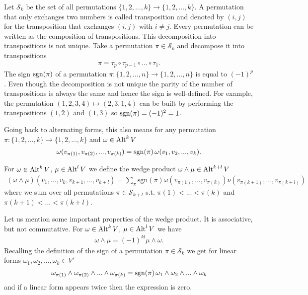 \documentclass[../master_thesis.tex]{subfiles}
\begin{document}
Let $\mathcal{S}_k$ be the set of all permutations 
$\{ 1, 2, ..., k\} \rightarrow \{ 1, 2, ..., k \}$. A 
permutation that only exchanges two numbers is called transposition 
and denoted by $(i,j)$ for the transposition that exchanges $(i,j)$ with 
$i \neq j$. Every permutation can be written as the composition of 
transpositions. This decomposition into transpositions is not unique.
Take a permutation $\pi \in \mathcal{S}_k$ and decompose it into transpositions
\begin{align*}
    \pi = \tau_p \circ \tau_{p-1} \circ ... \circ \tau_1.
\end{align*}
The sign $\operatorname{sgn}(\pi)$ of a permutation 
$\pi: \{ 1,2,...,n\} \rightarrow \{ 1,2, ..., n\}$ is equal to $(-1)^p$.
Even though the decomposition is not unique the parity of the number of
transpositions is always the same and hence the sign is well-defined.
For example, the permutation $(1,2,3,4) \mapsto (2,3,1,4)$ 
can be built by performing the transpositions $(1,2)$ and $(1,3)$ so 
$\operatorname{sgn}(\pi) = (-1)^2 = 1$. 

Going back to alternating forms, this also means for any permutation 
$\pi: \{1,2,...,k\} \rightarrow \{1,2,...,k\}$ and 
$\omega \in {\text{Alt}^{k}\,V}$
\begin{align*}
    \omega(v_{\pi(1)},v_{\pi(2)},...,v_{\pi(k)})
    = \operatorname{sgn}(\pi)\, \omega(v_1, v_2,..., v_k).
\end{align*}

\begin{definition}
    For $\omega \in 
    {\text{Alt}^{k}\,V}$, $\mu \in 
    {\text{Alt}^{l}\,V}$ we define the wedge product $\omega \wedge \mu \in 
    {\text{Alt}^{k+l}\,V}$ 
    \begin{align*}
        (\omega \wedge \mu) (v_1,...,v_k,v_{k+1},...,v_{k+l}) =
        \sum\limits_\pi
        \text{sgn}(\pi) \omega(v_{\pi(1)},...,v_{\pi(k)}) 
        \nu(v_{\pi(k+1)},...,v_{\pi(k+l)})
    \end{align*}
    where we sum over all permutations 
    $\pi \in \mathcal{S}_{k+l}$ 
    s.t. $\pi(1) < ... < \pi(k)$ and $\pi(k+1) < ... < \pi(k+l)$.        
\end{definition}

Let us mention some important properties of the wedge product. It is 
associative, but not commutative. For $\omega \in 
{\text{Alt}^{k}\,V}$, $\mu \in 
{\text{Alt}^{l}\,V}$ we have 
\begin{align}
    \omega \wedge \mu = (-1)^{kl} \mu \wedge \omega. \label{eq:commutativity_wedge_product}
\end{align}
Recalling the definition of the sign of a permutation $\pi \in \mathcal{S}_k$ 
we get for linear forms $\omega_1, \omega_2, ..., \omega_k \in V'$
\begin{align*}
    \omega_{\pi(1)} \wedge \omega_{\pi(2)} \wedge ... \wedge \omega_{\pi(k)}
    = \operatorname{sgn}(\pi) \, \omega_1 \wedge \omega_2 \wedge ... \wedge \omega_k
\end{align*}
and if a linear form appears twice then the expression is zero.
\end{document}
